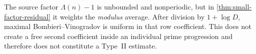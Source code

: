 \begin{remark}
The source factor $\Lambda(n)-1$ is unbounded and nonperiodic, but in
\cref{thm:small-factor-residual} it weights the \emph{modulus} average.
After division by $1+\log D$, maximal Bombieri--Vinogradov is uniform in
that row coefficient.  This does not create a free second coefficient
inside an individual prime progression and therefore does not constitute a
Type~II estimate.
\end{remark}
